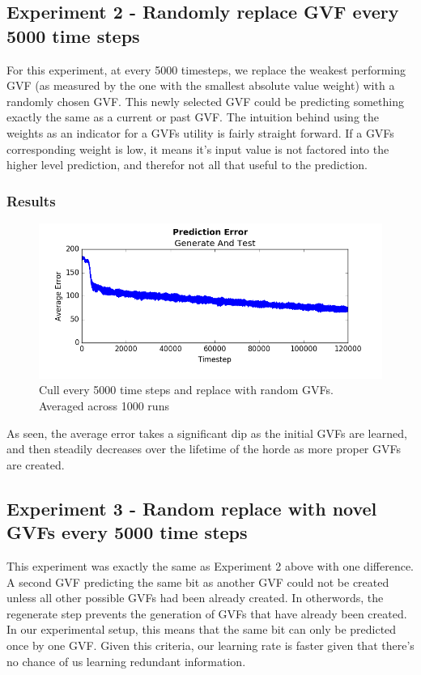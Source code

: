 \documentclass[letterpaper]{article}
\begin{document}
\subsection{Experiment 2 - Randomly replace GVF every 5000 time steps}
For this experiment, at every 5000 timesteps, we replace the weakest performing GVF (as measured by the one with the smallest absolute value weight) with a randomly chosen GVF. This newly selected GVF could be predicting something exactly the same as a current or past GVF. The intuition behind using the weights as an indicator for a GVFs utility is fairly straight forward. If a GVFs corresponding weight is low, it means it's input value is not factored into the higher level prediction, and therefor not all that useful to the prediction. 

\subsubsection{Results}

\begin{figure}[H]
  \centerline{\includegraphics[width = \linewidth]{Plots/AverageErrorKullEvery5000ReplaceRandomIncludingRepeats.png}}
  \caption{Cull every 5000 time steps and replace with random GVFs. Averaged across 1000 runs}
  \label{fig:experiment}
\end{figure}	

As seen, the average error takes a significant dip as the initial GVFs are learned, and then steadily decreases over the lifetime of the horde as more proper GVFs are created. 

\subsection{Experiment 3 - Random replace with novel GVFs every 5000 time steps}
This experiment was exactly the same as Experiment 2 above with one difference. A second GVF predicting the same bit as another GVF could not be created unless all other possible GVFs had been already created. In otherwords, the regenerate step prevents the generation of GVFs that have already been created. In our experimental setup, this means that the same bit can only be predicted once by one GVF. Given this criteria, our learning rate is faster given that there's no chance of us learning redundant information.
\end{document}
